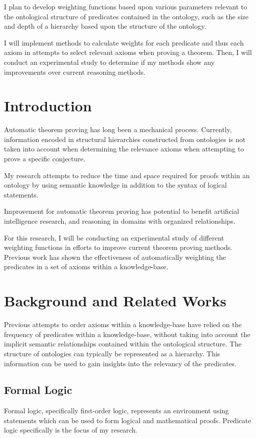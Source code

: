 \documentclass{article}
\begin{document}
I plan to develop weighting functions based upon various parameters relevant to the ontological structure of predicates contained in the ontology, such as the size and depth of a hierarchy based upon the structure of the ontology. 

I will implement methods to calculate weights for each predicate and thus each axiom in attempts to select relevant axioms when proving a theorem. Then, I will conduct an experimental study to determine if my methods show any improvements over current reasoning methods. 

\newpage

\section{Introduction}
Automatic theorem proving has long been a mechanical process. Currently, information encoded in structural hierarchies constructed from ontologies is not taken into account when determining the relevance axioms when attempting to prove a specific conjecture. 

My research attempts to reduce the time and space required for proofs within an ontology by using semantic knowledge in addition to the syntax of logical statements. 

Improvement for automatic theorem proving has potential to benefit artificial intelligence research, and reasoning in domains with organized relationships.

For this research, I will be conducting an experimental study of different weighting functions in efforts to improve current theorem proving methods. Previous work has shown the effectiveness of automatically weighting the predicates in a set of axioms within a knowledge-base.

\section{Background and Related Works}

Previous attempts to order axioms within a knowledge-base have relied on the frequency of predicates within a knowledge-base, without taking into account the implicit semantic relationships contained within the ontological structure. The structure of ontologies can typically be represented as a hierarchy. This information can be used to gain insights into the relevancy of the predicates. 

\subsection{Formal Logic}
Formal logic, specifically first-order logic, represents an environment using statements which can be used to form logical and mathematical proofs. Predicate logic specifically is the focus of my research.  
	
\end{document}
